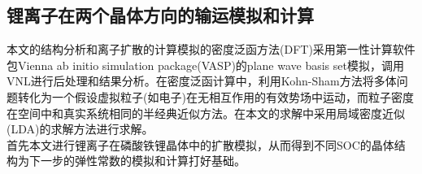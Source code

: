 \subsection{锂离子在两个晶体方向的输运模拟和计算}
本文的结构分析和离子扩散的计算模拟的密度泛函方法\cite{Kohn1965Self}(DFT)采用第一性计算软件包Vienna ab initio simulation package(VASP)的plane wave basis set\cite{Kresse1996Efficiency,Kresse1994Ab,Kresse1996Efficient}模拟，调用VNL进行后处理\cite{Schneider2017ATK,Stradi2017Method}和结果分析。在密度泛函计算中，利用Kohn-Sham方法将多体问题转化为一个假设虚拟粒子(如电子)在无相互作用的有效势场中运动，而粒子密度在空间中和真实系统相同的半经典近似方法\cite{Kohn1965Self}。在本文的求解中采用局域密度近似\cite{Vanderbilt1990Soft}(LDA)的求解方法进行求解。\\
\indent 首先本文进行锂离子在磷酸铁锂晶体中的扩散模拟，从而得到不同SOC的晶体结构为下一步的弹性常数的模拟和计算打好基础。
